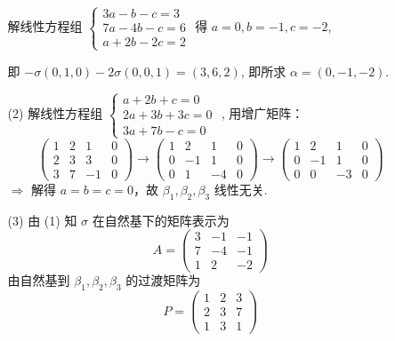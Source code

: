 \begin{enumerate}
\begin{enumerate}
        解线性方程组 \(\begin{cases}
            3a-b-c=3\\
            7a-4b-c=6\\
            a+2b-2c=2
            \end{cases}\) 得 \(a=0,b=-1,c=-2\), \par
            即 \(-\sigma(0,1,0)-2\sigma(0,0,1)=(3,6,2)\), 即所求 \(\alpha=(0,-1,-2)\).
        \item[(2)] 解线性方程组 \(\begin{cases}
            a+2b+c=0\\
            2a+3b+3c=0\\
            3a+7b-c=0
            \end{cases}\) , 用增广矩阵：
            \[
            \left(\begin{array}{ccc|c}
            1 & 2 & 1 & 0 \\
            2 & 3 & 3 & 0 \\
            3 & 7 & -1 & 0
            \end{array}\right) \to
            \left(\begin{array}{ccc|c}
            1 & 2 & 1 & 0 \\
            0 & -1 & 1 & 0 \\
            0 & 1 & -4 & 0
            \end{array}\right) \to
            \left(\begin{array}{ccc|c}
            1 & 2 & 1 & 0 \\
            0 & -1 & 1 & 0 \\
            0 & 0 & -3 & 0
            \end{array}\right)
            \] \(\Rightarrow\) 解得 \(a=b=c=0\)，故 \(\beta_1,\beta_2,\beta_3\) 线性无关.
        \item[(3)] 由 (1) 知 \(\sigma\) 在自然基下的矩阵表示为
        \[
        A=\begin{pmatrix}
            3 & -1 & -1\\
            7 & -4 & -1\\
            1 & 2 & -2
        \end{pmatrix}
        \]
        由自然基到 \(\beta_1,\beta_2,\beta_3\) 的过渡矩阵为
        \[
        P=\begin{pmatrix}
            1 & 2 & 3\\
            2 & 3 & 7\\
            1 & 3 & 1
        \end{pmatrix}
\]
\end{enumerate}
\end{enumerate}
